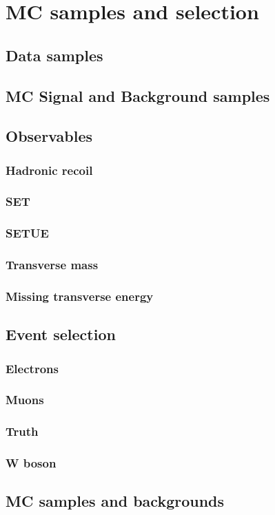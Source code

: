 \chapter{MC samples and selection}
    
    \section{Data samples}
    \section{MC Signal and Background samples}
    
    \section{Observables}
    \subsection{Hadronic recoil}
    \subsection{SET}
    \subsection{SETUE}
    \subsection{Transverse mass}
    \subsection{Missing transverse energy}
     
     \section{Event selection}
     \subsection{Electrons}
     \subsection{Muons}
     \subsection{Truth}
     \subsection{W boson}
      \section{MC samples and backgrounds}
     
